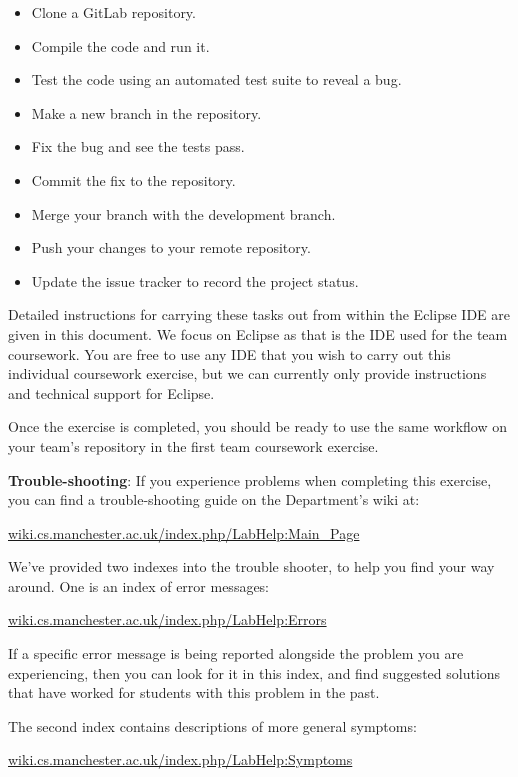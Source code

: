 \documentclass[
]{book}
\providecommand{\tightlist}{%
  \setlength{\itemsep}{0pt}\setlength{\parskip}{0pt}}
\begin{document}
\begin{itemize}
\tightlist
\item
  Clone a GitLab repository.
\item
  Compile the code and run it.
\item
  Test the code using an automated test suite to reveal a bug.
\item
  Make a new branch in the repository.
\item
  Fix the bug and see the tests pass.
\item
  Commit the fix to the repository.
\item
  Merge your branch with the development branch.
\item
  Push your changes to your remote repository.
\item
  Update the issue tracker to record the project status.
\end{itemize}

Detailed instructions for carrying these tasks out from within the Eclipse IDE are given in this document. We focus on Eclipse as that is the IDE used for the team coursework. You are free to use any IDE that you wish to carry out this individual coursework exercise, but we can currently only provide instructions and technical support for Eclipse.

Once the exercise is completed, you should be ready to use the same workflow on your team's repository in the first team coursework exercise.

\textbf{Trouble-shooting}: If you experience problems when completing this exercise, you can find a trouble-shooting guide on the Department's wiki at:

\href{https://wiki.cs.manchester.ac.uk/index.php/LabHelp:Main_Page}{wiki.cs.manchester.ac.uk/index.php/LabHelp:Main\_Page}

We've provided two indexes into the trouble shooter, to help you find your way around. One is an index of error messages:

\href{https://wiki.cs.manchester.ac.uk/index.php/LabHelp:Errors}{wiki.cs.manchester.ac.uk/index.php/LabHelp:Errors}

If a specific error message is being reported alongside the problem you are experiencing, then you can look for it in this index, and find suggested solutions that have worked for students with this problem in the past.

The second index contains descriptions of more general symptoms:

\href{https://wiki.cs.manchester.ac.uk/index.php/LabHelp:Symptoms}{wiki.cs.manchester.ac.uk/index.php/LabHelp:Symptoms}
\end{document}
